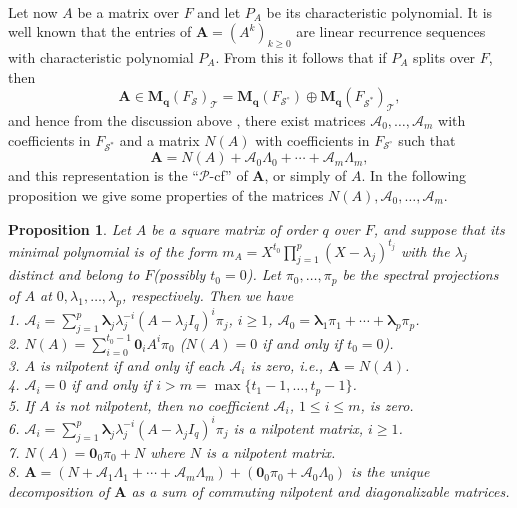 \documentclass[12pt]{amsart}
\newtheorem{prop}[thrm]{Proposition}
\theoremstyle{definition}
\numberwithin{equation}{section}
\numberwithin{equation}{section}
\begin{document}
\\Let now $A$ be a matrix over $F$ and let $P_{A}$ be its characteristic polynomial. It is well known that the entries of $\pmb{A}=(A^{k})_{k\geq 0}$ are linear recurrence sequences with characteristic polynomial $P_{A}$. From this it follows that if $P_{A}$ splits over $F$, then $$\pmb{A}\in \mathbf{M_{q}}(F_{\mathcal{S}})_{\mathcal{T}}=
\mathbf{M_{q}}(F_{\mathcal{S}^{\circ}})\oplus\mathbf{M_{q}}(F_{\mathcal{S}^{\ast}})_{\mathcal{T}},$$ and hence from the discussion above , there exist matrices $\mathcal{A}_{0},\ldots, \mathcal{A}_{m}$ with coefficients in $F_{\mathcal{S}^{\ast}}$ and a matrix $N(A)$ with coefficients in $F_{\mathcal{S}^{\circ}}$ such that
 $$\pmb{A}= N(A) + \mathcal{A}_{0}\Lambda_{0} + \cdots + \mathcal{A}_{m}\Lambda_{m},$$
and this representation is the \enquote{$\mathcal{P}$-cf} of $\pmb{A}$, or simply of $A$.
In the following proposition we give some properties of the matrices $N(A),\mathcal{A}_{0},\ldots, \mathcal{A}_{m}$.
\begin{prop}\label{Prop 23} Let $A$ be a square matrix of order $q$ over $F$, and suppose that its minimal polynomial is of the form $m_{A}=X^{t_{0}}\prod_{j=1}^{p}\displaystyle(X-\lambda_{j})^{t_{j}}$ with the $\lambda_{j}$ distinct and belong to $F$(possibly $t_{0}=0$). Let $\pi_{0},\ldots,\pi_{p}$ be the spectral projections of $A$ at $0,\lambda_{1},\ldots,\lambda_{p}$, respectively. Then we have
\\1. $\mathcal{A}_{i}=\displaystyle\sum_{j=1}^{p}\pmb{\lambda}_{j}\lambda_{j}^{-i}(A-\lambda_{j}I_{q})^{i}\pi_{j}$, $i\geqslant 1$, $\mathcal{A}_{0}=\pmb{\lambda}_{1}\pi_{1}+\cdots+\pmb{\lambda}_{p}\pi_{p}$.
\\2. $N(A)=\displaystyle\sum_{i=0}^{t_{0}-1}\pmb{0}_{i}A^{i}\pi_{0}$ ($N(A)=0$ if and only if $t_{0}=0$).
\\3. $A$ is nilpotent if and only if each $\mathcal{A}_{i}$ is zero, i.e., $\pmb{A}= N(A)$.
\\4. $\mathcal{A}_{i}=0$ if and only if $i> m=\max\{t_{1}-1,\ldots,t_{p}-1\}$.
\\5. If $A$ is not nilpotent, then no coefficient $\mathcal{A}_{i}$, $1\leq i\leq m$, is zero.
\\6. $\mathcal{A}_{i}=\displaystyle\sum_{j=1}^{p}\pmb{\lambda}_{j}\lambda_{j}^{-i}(A-\lambda_{j}I_{q})^{i}\pi_{j}$ is a nilpotent matrix, $i\geqslant 1$.
\\7. $N(A)=\pmb{0}_{0}\pi_{0}+N$ where $N$ is a nilpotent matrix.
\\8. $\pmb{A}= (N + \mathcal{A}_{1}\Lambda_{1} + \cdots + \mathcal{A}_{m}\Lambda_{m}) + (\pmb{0}_{0}\pi_{0}+\mathcal{A}_{0}\Lambda_{0})$ is the unique decomposition of $\pmb{A}$ as a sum of commuting nilpotent and diagonalizable matrices.
\end{prop}
\end{document}
